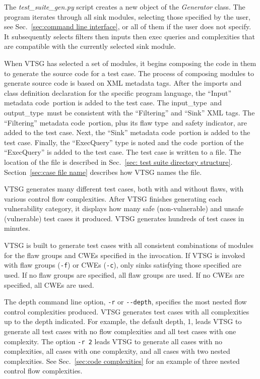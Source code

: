 \documentclass[12pt]{article}
\begin{document}
The \emph{test\_suite\_gen.py} script creates a new object of the
\emph{Generator} class. 
The program iterates through all sink modules, selecting those
specified by the user, see
Sec.~\ref{sec:command line interface}, 
or all of them if the user does not specify. It subsequently
selects filters then inputs then exec queries and complexities
that are compatible with the currently selected sink module.

When VTSG has selected a set of modules, it begins composing
the code in them to generate the source code for a test case.
The process of composing modules to generate source code is
based on XML metadata tags.
After the imports and class definition declaration for the 
specific program
language, the ``Input'' metadata \texlangle code\texrangle\  portion 
is added to the test case.  
The \texlangle input\_type\texrangle\ and 
\texlangle output\_type\texrangle\ 
must be consistent with the ``Filtering'' and ``Sink'' XML tags.  The 
``Filtering'' metadata \texlangle code\texrangle\ portion, plus its 
\texlangle flaw type\texrangle\ and safety indicator, are added to 
the test case.  Next, the ``Sink'' metadata 
\texlangle code\texrangle\ portion 
is added to the test case.  Finally, the ``ExecQuery'' type is 
noted and the 
\texlangle code\texrangle\ portion of the ``ExecQuery'' is added 
to the 
test case.  The test case is written to a file.  
The location of the file is
described in Sec.~\ref{sec: test suite directory structure}.
Section~\ref{sec:case file name} describes how VTSG names the file.

VTSG generates many different test cases, both with and without
flaws, with various control flow complexities.  After VTSG finishes
generating each vulnerability category, it displays how many safe (non-vulnerable)
and unsafe (vulnerable) test cases it produced.
VTSG generates hundreds of test cases in minutes.

VTSG is built to generate test cases with all consistent combinations
of modules for the flaw groups and CWEs specified in the invocation.
If VTSG is invoked with flaw groups (\verb|-f|) or CWEs (\verb|-c|),
only sinks satisfying those specified are used.
If no flaw groups are specified, all flaw groups are used.  
If no CWEs are specified, all CWEs are used.

\label{sec:depth of complexities}
The depth command line option, \verb|-r| or \verb|--depth|, 
specifies the
most nested flow control complexities produced.
VTSG generates test cases with all complexities up to the depth
indicated.
For example, the default depth, 1, leads VTSG to generate all
test cases with no flow complexities and all test cases with 
one complexity.  The option \verb|-r 2| leads VTSG to generate
all cases with no complexities, all cases with one complexity, 
and all cases with two nested complexities.
See Sec.~\ref{sec:code complexities} for an example of three 
nested control flow complexities.
\end{document}
